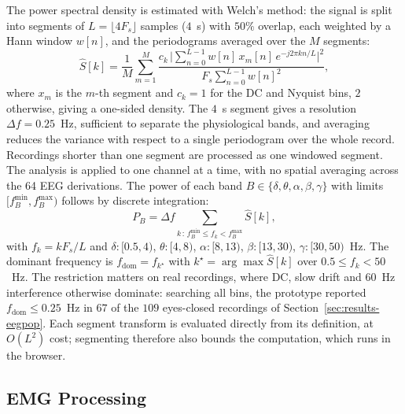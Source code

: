 \documentclass[conference]{IEEEtran}
\begin{document}
The power spectral density is estimated with Welch's method: the signal is split into segments of $L=\lfloor 4F_s\rfloor$ samples ($4$~s) with $50\%$ overlap, each weighted by a Hann window $w[n]$, and the periodograms averaged over the $M$ segments:
\begin{equation}
\hat{S}[k] = \frac{1}{M}\sum_{m=1}^{M} \frac{c_k\,\bigl\lvert \sum_{n=0}^{L-1} w[n]\,x_m[n]\,e^{-j2\pi kn/L} \bigr\rvert^{2}}{F_s\sum_{n=0}^{L-1} w[n]^{2}},
\label{eq:welch}
\end{equation}
where $x_m$ is the $m$-th segment and $c_k=1$ for the DC and Nyquist bins, $2$ otherwise, giving a one-sided density. The $4$~s segment gives a resolution $\Delta f=0.25$~Hz, sufficient to separate the physiological bands, and averaging reduces the variance with respect to a single periodogram over the whole record. Recordings shorter than one segment are processed as one windowed segment. The analysis is applied to one channel at a time, with no spatial averaging across the 64 EEG derivations. The power of each band $B\in\{\delta,\theta,\alpha,\beta,\gamma\}$ with limits $[f_B^{\min},f_B^{\max})$ follows by discrete integration:
\begin{equation}
P_B = \Delta f \sum_{k\,:\, f_B^{\min} \le f_k < f_B^{\max}} \hat{S}[k],
\label{eq:bandpower}
\end{equation}
with $f_k = kF_s/L$ and $\delta{:}[0.5,4)$, $\theta{:}[4,8)$, $\alpha{:}[8,13)$, $\beta{:}[13,30)$, $\gamma{:}[30,50)$~Hz. The dominant frequency is $f_{\mathrm{dom}}=f_{k^\star}$ with $k^\star=\arg\max \hat{S}[k]$ over $0.5\le f_k<50$~Hz. The restriction matters on real recordings, where DC, slow drift and $60$~Hz interference otherwise dominate: searching all bins, the prototype reported $f_{\mathrm{dom}}\le0.25$~Hz in $67$ of the $109$ eyes-closed recordings of Section~\ref{sec:results-eegpop}. Each segment transform is evaluated directly from its definition, at $O(L^{2})$ cost; segmenting therefore also bounds the computation, which runs in the browser.

\subsection{EMG Processing}
\end{document}
